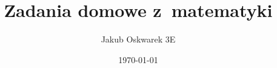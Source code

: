 \documentclass[a4paper, fleqn, oneside, dvipsnames, leqno]{report}
\title{Zadania domowe z~matematyki}
\author{Jakub Oskwarek 3E}
\date{\today}
\begin{document}
    
    \label{lastpage}
\end{document}
